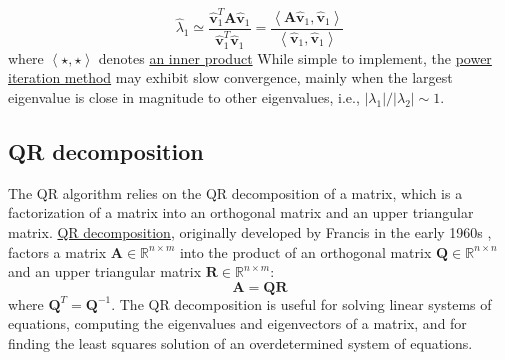 \documentclass{article}[11pt]
\begin{document}
\begin{mdframed}
\begin{itemize}[leftmargin=16pt]
{   \begin{equation}
      \hat{\lambda}_{1} \simeq \frac{\hat{\mathbf{v}}_{1}^{T}\mathbf{A}\hat{\mathbf{v}}_{1}}{\hat{\mathbf{v}}_{1}^{T}\hat{\mathbf{v}}_{1}} = \frac{\left<\mathbf{A}\hat{\mathbf{v}}_{1},\hat{\mathbf{v}}_{1}\right>}{\left<\hat{\mathbf{v}}_{1},\hat{\mathbf{v}}_{1}\right>}
   \end{equation}
where $\left<\star,\star\right>$ denotes \href{https://mathworld.wolfram.com/InnerProduct.html}{an inner product}}
While simple to implement, the \href{https://en.wikipedia.org/wiki/Power_iteration}{power iteration method} may exhibit slow convergence, mainly when the largest eigenvalue is close in magnitude to other eigenvalues, i.e., $|\lambda_{1}|/|\lambda_{2}| \sim 1$.
\end{itemize}
\end{mdframed}


\subsection{QR decomposition}
The QR algorithm relies on the QR decomposition of a matrix, which is a factorization of a matrix into an orthogonal matrix and an upper triangular matrix.
\href{https://en.wikipedia.org/wiki/QR_decomposition}{QR decomposition}, originally developed by Francis in the early 1960s \cite{Francis-QR-1961, Francis-QR-1962}, factors a matrix $\mathbf{A}\in\mathbb{R}^{n\times{m}}$ 
into the product of an orthogonal matrix $\mathbf{Q}\in\mathbb{R}^{n\times{n}}$ and 
an upper triangular matrix $\mathbf{R}\in\mathbb{R}^{n\times{m}}$:
\begin{equation}
\mathbf{A} = \mathbf{Q}\mathbf{R}
\end{equation}
where $\mathbf{Q}^{T} = \mathbf{Q}^{-1}$. 
The QR decomposition is useful for solving linear systems of equations, computing the eigenvalues and eigenvectors of a matrix, and for finding the least squares solution of an overdetermined system of equations.
\end{document}
